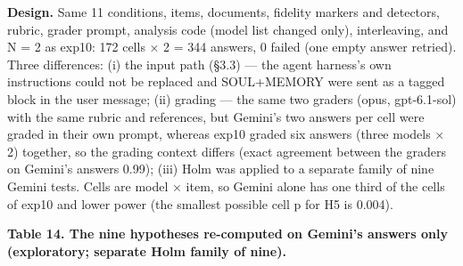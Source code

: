 \documentclass[10pt]{article}
\begin{document}
\textbf{Design.} Same 11 conditions, items, documents, fidelity markers and detectors, rubric, grader prompt, analysis code (model list changed only), interleaving, and N = 2 as exp10: 172 cells × 2 = 344 answers, 0 failed (one empty answer retried). Three differences: (i) the input path (§3.3) --- the agent harness's own instructions could not be replaced and SOUL+MEMORY were sent as a tagged block in the user message; (ii) grading --- the same two graders (opus, gpt-6.1-sol) with the same rubric and references, but Gemini's two answers per cell were graded in their own prompt, whereas exp10 graded six answers (three models × 2) together, so the grading context differs (exact agreement between the graders on Gemini's answers 0.99); (iii) Holm was applied to a separate family of nine Gemini tests. Cells are model × item, so Gemini alone has one third of the cells of exp10 and lower power (the smallest possible cell p for H5 is 0.004).

\textbf{Table 14. The nine hypotheses re-computed on Gemini's answers only (exploratory; separate Holm family of nine).}
\end{document}
